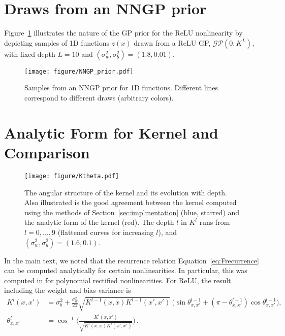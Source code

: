 \documentclass{article} %
\begin{document}
\newpage
\begin{appendix}

\section{Draws from an NNGP prior}

Figure~\ref{fig:prior} illustrates the nature of the GP prior for the ReLU nonlinearity by depicting samples of 1D functions $z(x)$ drawn from a ReLU GP, $\mathcal{GP}(0, K^{L})$, with fixed depth $L = 10$ and $(\sigma^2_w, \sigma^2_b) = (1.8, 0.01)$.
\begin{figure}[h!]
\centering
  \texttt{[image: figure/NNGP\_prior.pdf]}
  \caption{Samples from an NNGP prior for 1D functions. Different lines correspond to different draws (arbitrary colors).}
 \label{fig:prior}
\end{figure}


\section{Analytic Form for Kernel and Comparison}
\label{sec:arccos}

\begin{figure}[ht]
  \centering
  \texttt{[image: figure/Ktheta.pdf]}
  \caption{The angular structure of the kernel and its evolution with depth. Also illustrated is the good agreement between the kernel computed using the methods of Section~\ref{sec:implmentation} (blue, starred) and the analytic form of the kernel (red). The depth $l$ in $K^{l}$ runs from $l=0, ..., 9$ (flattened curves for increasing $l$), and $(\sigma^2_w, \sigma^2_b) = (1.6, 0.1)$.}
  \label{fig:angular}
\end{figure}

In the main text, we noted that the recurrence relation Equation~\ref{eq:Frecurrence} can be computed analytically for certain nonlinearities. In particular, this was computed in \cite{cho2009} for polynomial rectified nonlinearities. For ReLU, the result including the weight and bias variance is
\begin{align}
K^{l}(x,x') &= \sigma^2_b + \frac{\sigma^2_w}{2\pi}\sqrt{K^{l-1}(x,x) K^{l-1}(x',x')} \, \bigg( \sin\theta^{l-1}_{x,x'} + (\pi - \theta^{l-1}_{x,x'}) \cos\theta^{l-1}_{x,x'} \bigg), \nonumber\\
\theta^{l}_{x,x'} &= \cos^{-1}\bigg(\frac{K^{l}(x,x')}{\sqrt{K^{l}(x,x) K^{l}(x',x')}} \bigg)\,.
\label{eq:chosaul}
\end{align}


\end{appendix}
\end{document}
